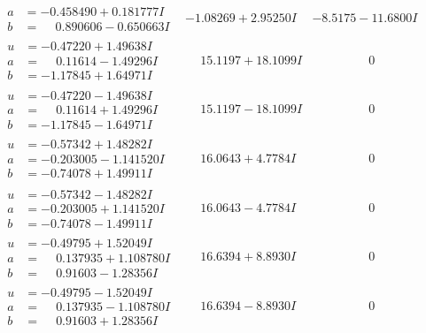 \documentclass[1p]{elsarticle_modified}
\theoremstyle{definition}
\begin{document}
$$\begin{array}{c|c|c}
\begin{aligned}
a &= -0.458490 + 0.181777 I \\
b &= \phantom{-}0.890606 - 0.650663 I\end{aligned}
 & -1.08269 + 2.95250 I & -8.5175 - 11.6800 I \\ \hline\begin{aligned}
u &= -0.47220 + 1.49638 I \\
a &= \phantom{-}0.11614 - 1.49296 I \\
b &= -1.17845 + 1.64971 I\end{aligned}
 & \phantom{-}15.1197 + 18.1099 I & \phantom{-0.000000 } 0 \\ \hline\begin{aligned}
u &= -0.47220 - 1.49638 I \\
a &= \phantom{-}0.11614 + 1.49296 I \\
b &= -1.17845 - 1.64971 I\end{aligned}
 & \phantom{-}15.1197 - 18.1099 I & \phantom{-0.000000 } 0 \\ \hline\begin{aligned}
u &= -0.57342 + 1.48282 I \\
a &= -0.203005 - 1.141520 I \\
b &= -0.74078 + 1.49911 I\end{aligned}
 & \phantom{-}16.0643 + 4.7784 I & \phantom{-0.000000 } 0 \\ \hline\begin{aligned}
u &= -0.57342 - 1.48282 I \\
a &= -0.203005 + 1.141520 I \\
b &= -0.74078 - 1.49911 I\end{aligned}
 & \phantom{-}16.0643 - 4.7784 I & \phantom{-0.000000 } 0 \\ \hline\begin{aligned}
u &= -0.49795 + 1.52049 I \\
a &= \phantom{-}0.137935 + 1.108780 I \\
b &= \phantom{-}0.91603 - 1.28356 I\end{aligned}
 & \phantom{-}16.6394 + 8.8930 I & \phantom{-0.000000 } 0 \\ \hline\begin{aligned}
u &= -0.49795 - 1.52049 I \\
a &= \phantom{-}0.137935 - 1.108780 I \\
b &= \phantom{-}0.91603 + 1.28356 I\end{aligned}
 & \phantom{-}16.6394 - 8.8930 I & \phantom{-0.000000 } 0\\

\end{array}$$
\end{document}
